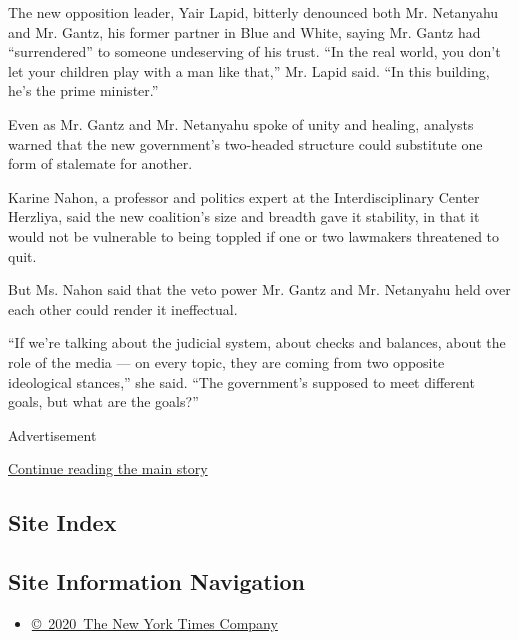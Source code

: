 The new opposition leader, Yair Lapid, bitterly denounced both Mr.
Netanyahu and Mr. Gantz, his former partner in Blue and White, saying
Mr. Gantz had ``surrendered'' to someone undeserving of his trust. ``In
the real world, you don't let your children play with a man like that,''
Mr. Lapid said. ``In this building, he's the prime minister.''

Even as Mr. Gantz and Mr. Netanyahu spoke of unity and healing, analysts
warned that the new government's two-headed structure could substitute
one form of stalemate for another.

Karine Nahon, a professor and politics expert at the Interdisciplinary
Center Herzliya, said the new coalition's size and breadth gave it
stability, in that it would not be vulnerable to being toppled if one or
two lawmakers threatened to quit.

But Ms. Nahon said that the veto power Mr. Gantz and Mr. Netanyahu held
over each other could render it ineffectual.

``If we're talking about the judicial system, about checks and balances,
about the role of the media --- on every topic, they are coming from two
opposite ideological stances,'' she said. ``The government's supposed to
meet different goals, but what are the goals?''

Advertisement

\protect\hyperlink{after-bottom}{Continue reading the main story}

\hypertarget{site-index}{%
\subsection{Site Index}\label{site-index}}

\hypertarget{site-information-navigation}{%
\subsection{Site Information
Navigation}\label{site-information-navigation}}

\begin{itemize}
\tightlist
\item
  \href{https://help.nytimes3xbfgragh.onion/hc/en-us/articles/115014792127-Copyright-notice}{©~2020~The
  New York Times Company}
\end{itemize}

